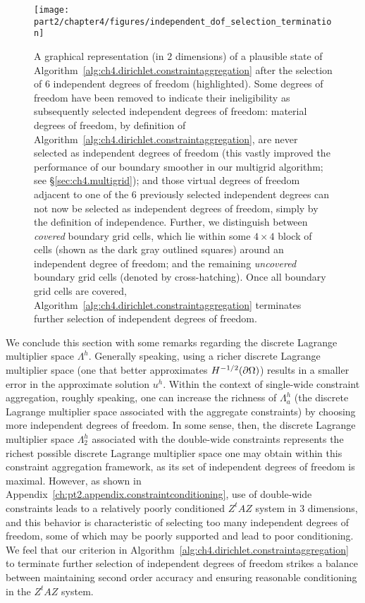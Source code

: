\setlength{\figurewidth}{0.50\textwidth}
\begin{figure}[htb]
\centering
\texttt{[image: part2/chapter4/figures/independent\_dof\_selection\_termination]}
\caption{A graphical representation (in $2$ dimensions) of a plausible state of Algorithm~\ref{alg:ch4.dirichlet.constraintaggregation} after the selection of $6$ independent degrees of freedom (highlighted). Some degrees of freedom have been removed to indicate their ineligibility as subsequently selected independent degrees of freedom: material degrees of freedom, by definition of Algorithm~\ref{alg:ch4.dirichlet.constraintaggregation}, are never selected as independent degrees of freedom (this vastly improved the performance of our boundary smoother in our multigrid algorithm; see \S\ref{sec:ch4.multigrid}); and those virtual degrees of freedom adjacent to one of the $6$ previously selected independent degrees can not now be selected as independent degrees of freedom, simply by the definition of independence. Further, we distinguish between \emph{covered} boundary grid cells, which lie within some $4 \times 4$ block of cells (shown as the dark gray outlined squares) around an independent degree of freedom; and the remaining \emph{uncovered} boundary grid cells (denoted by cross-hatching). Once all boundary grid cells are covered, Algorithm~\ref{alg:ch4.dirichlet.constraintaggregation} terminates further selection of independent degrees of freedom.}
\label{fig:ch4.indydoftermination}
\end{figure}

We conclude this section with some remarks regarding the discrete Lagrange multiplier space $\Lambda^h$. Generally speaking, using a richer discrete Lagrange multiplier space (one that better approximates $H^{-1/2}(\partial\Omega)$) results in a smaller error in the approximate solution $u^h$. Within the context of single-wide constraint aggregation, roughly speaking, one can increase the richness of $\Lambda^h_a$ (the discrete Lagrange multiplier space associated with the aggregate constraints) by choosing more independent degrees of freedom. In some sense, then, the discrete Lagrange multiplier space $\Lambda^h_2$ associated with the double-wide constraints represents the richest possible discrete Lagrange multiplier space one may obtain within this constraint aggregation framework, as its set of independent degrees of freedom is maximal. However, as shown in Appendix~\ref{ch:pt2.appendix.constraintconditioning}, use of double-wide constraints leads to a relatively poorly conditioned $Z^tAZ$ system in $3$ dimensions, and this behavior is characteristic of selecting too many independent degrees of freedom, some of which may be poorly supported and lead to poor conditioning. We feel that our criterion in Algorithm~\ref{alg:ch4.dirichlet.constraintaggregation} to terminate further selection of independent degrees of freedom strikes a balance between maintaining second order accuracy and ensuring reasonable conditioning in the $Z^tAZ$ system.

